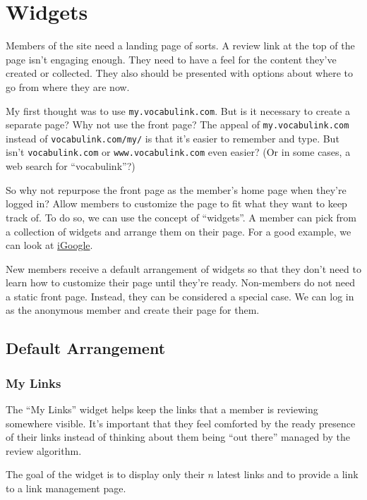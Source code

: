 \chapter{Widgets}

Members of the site need a landing page of sorts. A review link at the top of
the page isn't engaging enough. They need to have a feel for the content
they've created or collected. They also should be presented with options about
where to go from where they are now.

My first thought was to use \texttt{my.vocabulink.com}. But is it necessary to
create a separate page? Why not use the front page? The appeal of
\texttt{my.vocabulink.com} instead of \texttt{vocabulink.com/my/} is that it's
easier to remember and type. But isn't \texttt{vocabulink.com} or
\texttt{www.vocabulink.com} even easier? (Or in some cases, a web search for
``vocabulink''?)

So why not repurpose the front page as the member's home page when they're
logged in? Allow members to customize the page to fit what they want to keep
track of. To do so, we can use the concept of ``widgets''. A member can pick
from a collection of widgets and arrange them on their page. For a good
example, we can look at \href{http://www.google.com/ig}{iGoogle}.

New members receive a default arrangement of widgets so that they don't need
to learn how to customize their page until they're ready. Non-members do not
need a static front page. Instead, they can be considered a special case. We
can log in as the anonymous member and create their page for them.

\section{Default Arrangement}

\subsection{My Links}

The ``My Links'' widget helps keep the links that a member is reviewing
somewhere visible. It's important that they feel comforted by the ready
presence of their links instead of thinking about them being ``out there''
managed by the review algorithm.

The goal of the widget is to display only their $n$ latest links and to provide
a link to a link management page.
